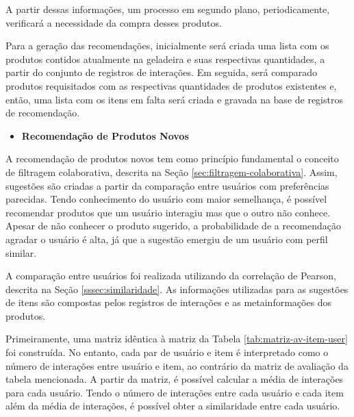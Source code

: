 A partir dessas informações, um processo em segundo plano, periodicamente, verificará a necessidade da compra desses produtos.

Para a geração das recomendações, inicialmente será criada uma lista com os produtos contidos atualmente na geladeira e suas respectivas quantidades, a partir do conjunto de registros de interações. Em seguida, será comparado produtos requisitados com as respectivas quantidades de produtos existentes e, então, uma lista com os itens em falta será criada e gravada na base de registros de recomendação.
 

\begin{itemize}
    \item \textbf{Recomendação de Produtos Novos}
\end{itemize}

A recomendação de produtos novos tem como princípio fundamental o conceito de filtragem colaborativa, descrita na Seção \ref{sec:filtragem-colaborativa}. Assim, sugestões são criadas a partir da comparação entre usuários com preferências parecidas. Tendo conhecimento do usuário com maior semelhança, é possível recomendar produtos que um usuário interagiu mas que o outro não conhece. Apesar de não conhecer o produto sugerido, a probabilidade de a recomendação agradar o usuário é alta, já que a sugestão emergiu de um usuário com perfil similar.

A comparação entre usuários foi realizada utilizando da correlação de Pearson, descrita na Seção \ref{sssec:similaridade}. As informações utilizadas para as sugestões de itens são compostas pelos registros de interações e as metainformações dos produtos. 

Primeiramente, uma matriz idêntica à matriz da Tabela \ref{tab:matriz-av-item-user} foi construída. No entanto, cada par de usuário e item é interpretado como o número de interações entre usuário e item, ao contrário da matriz de avaliação da tabela mencionada. A partir da matriz, é possível calcular a média de interações para cada usuário. Tendo o número de interações entre cada usuário e cada item além da média de interações, é possível obter a similaridade entre cada usuário.

